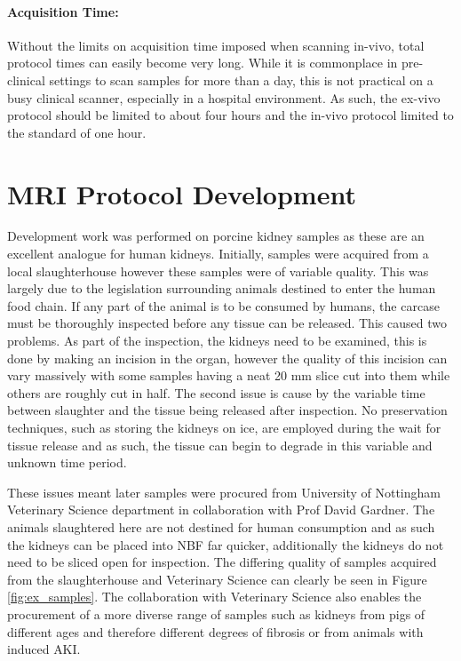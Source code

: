 \paragraph{Acquisition Time:} Without the limits on acquisition time imposed when scanning in-vivo, total protocol times can easily become very long. While it is commonplace in pre-clinical settings to scan samples for more than a day, this is not practical on a busy clinical scanner, especially in a hospital environment. As such, the ex-vivo protocol should be limited to about four hours and the in-vivo protocol limited to the standard of one hour.

\section{MRI Protocol Development}
Development work was performed on porcine kidney samples as these are an excellent analogue for human kidneys. Initially, samples were acquired from a local slaughterhouse however these samples were of variable quality. This was largely due to the legislation surrounding animals destined to enter the human food chain. If any part of the animal is to be consumed by humans, the carcase must be thoroughly inspected before any tissue can be released. This caused two problems. As part of the inspection, the kidneys need to be examined, this is done by making an incision in the organ, however the quality of this incision can vary massively with some samples having a neat 20 mm slice cut into them while others are roughly cut in half. The second issue is cause by the variable time between slaughter and the tissue being released after inspection. No preservation techniques, such as storing the kidneys on ice, are employed during the wait for tissue release and as such, the tissue can begin to degrade in this variable and unknown time period.

These issues meant later samples were procured from University of Nottingham Veterinary Science department in collaboration with Prof David Gardner. The animals slaughtered here are not destined for human consumption and as such the kidneys can be placed into \ac{NBF} far quicker, additionally the kidneys do not need to be sliced open for inspection. The differing quality of samples acquired from the slaughterhouse and Veterinary Science can clearly be seen in Figure \ref{fig:ex_samples}. The collaboration with Veterinary Science also enables the procurement of a more diverse range of samples such as kidneys from pigs of different ages and therefore different degrees of fibrosis or from animals with induced \ac{AKI}.  

